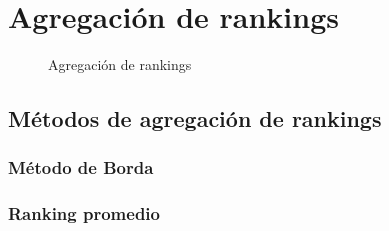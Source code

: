 \chapter{Agregación de rankings}

\begin{figure}[htb]
\centering
\agregacionrankings
\caption{Agregación de rankings}
\label{fig:agregación_rankings}
\end{figure}

\section{Métodos de agregación de rankings}
\subsection{Método de Borda}
\subsection{Ranking promedio}

